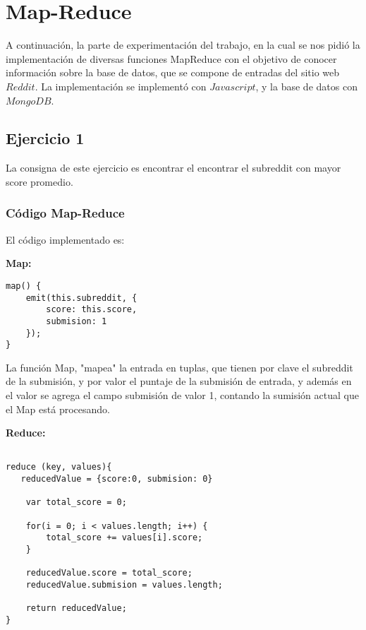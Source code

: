 \section{Map-Reduce}

A continuaci\'on, la parte de experimentaci\'on del trabajo, en la cual se nos pidi\'o la implementaci\'on de diversas funciones MapReduce con el objetivo de conocer informaci\'on sobre la base de datos, que se compone de entradas del sitio web $Reddit$. La implementaci\'on se implement\'o con $Javascript$, y la base de datos con $MongoDB$.

\subsection{Ejercicio 1}

La consigna de este ejercicio es encontrar el encontrar el subreddit con mayor score promedio.

\subsubsection{C\'odigo Map-Reduce}

El c\'odigo implementado es:

\textbf{Map:}

\begin{lstlisting}
map() {
    emit(this.subreddit, {
    	score: this.score,
    	submision: 1
    });
}

\end{lstlisting}

La funci\'on Map, "mapea"  la entrada en tuplas, que tienen por clave el subreddit de la submisi\'on, y por valor el puntaje de la submisi\'on de entrada, y adem\'as en el valor se agrega el campo submisi\'on de valor 1, contando la sumisi\'on actual que el Map est\'a procesando.

\vspace{2mm}

\textbf{Reduce:}

\begin{lstlisting}

reduce (key, values){
   reducedValue = {score:0, submision: 0}

    var total_score = 0;

	for(i = 0; i < values.length; i++) {
		total_score += values[i].score;
	}

	reducedValue.score = total_score;
	reducedValue.submision = values.length;

    return reducedValue;
}

\end{lstlisting}

